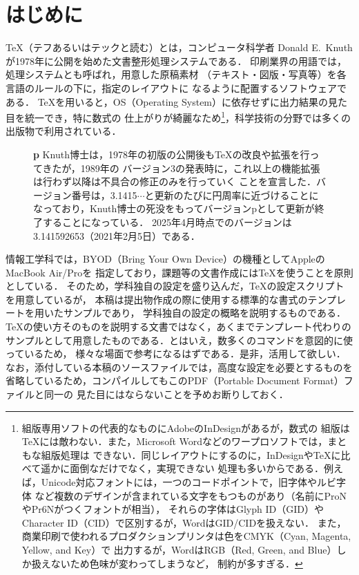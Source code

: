 \section{はじめに}

{\TeX}（テフあるいはテックと読む）とは，コンピュータ科学者
Donald E.\ Knuth \cite{Knuth}が1978年に公開を始めた文書整形処理システムである．
印刷業界の用語では，処理システムとも呼ばれ，用意した原稿素材
（テキスト・図版・写真等）を各言語のルール\cite{JIS}\cite{typst}の下に，指定のレイアウトに
なるように配置するソフトウェアである．
{\TeX}を用いると，OS（Operating System）に依存せずに出力結果の見た目を統一でき，特に数式の
仕上がりが綺麗なため\footnote{組版専用ソフトの代表的なものにAdobeのInDesignがあるが，数式の
組版は{\TeX}には敵わない．また，Microsoft Wordなどのワープロソフトでは，まともな組版処理は
できない．同じレイアウトにするのに，InDesignや{\TeX}に比べて遥かに面倒なだけでなく，実現できない
処理も多いからである．例えば，Unicode対応フォントには，一つのコードポイントで，旧字体やルビ字体
など複数のデザインが含まれている文字をもつものがあり（名前にProNやPr6Nがつくフォントが相当），
それらの字体はGlyph ID（GID）やCharacter ID（CID）で区別するが，WordはGID/CIDを扱えない．
また，商業印刷で使われるプロダクションプリンタは色をCMYK（Cyan, Magenta, Yellow, and Key）で
出力するが，WordはRGB（Red, Green, and Blue）しか扱えないため色味が変わってしまうなど，
制約が多すぎる．}，科学技術の分野では多くの出版物で利用されている．
\begin{figure}[b]
\begin{itembox}[l]{ \bfseries{\robotolgr p}}
\small\sffamily\mgfamily
Knuth博士は，1978年の初版の公開後も{\TeX}の改良や拡張を行ってきたが，1989年の
バージョン3の発表時に，これ以上の機能拡張は行わず以降は不具合の修正のみを行っていく
ことを宣言した．バージョン番号は，3.1415$\cdots$と更新のたびに円周率に近づけることに
なっており，Knuth博士の死没をもってバージョン{\robotolgr p}として更新が終了することになっている．
2025年4月時点でのバージョンは3.141592653（2021年2月5日）である．
\end{itembox}
\end{figure}

情報工学科では，BYOD（Bring Your Own Device）の機種としてAppleのMacBook Air/Proを
指定しており，課題等の文書作成には{\TeX}を使うことを原則としている．
そのため，学科独自の設定を盛り込んだ，{\TeX}の設定スクリプトを用意しているが，
本稿は提出物作成の際に使用する標準的な書式のテンプレートを用いたサンプルであり，
学科独自の設定の概略を説明するものである．
{\TeX}の使い方そのものを説明する文書ではなく，あくまでテンプレート代わりの
サンプルとして用意したものである．とはいえ，数多くのコマンドを意図的に使っているため，
様々な場面で参考になるはずである．是非，活用して欲しい．
なお，添付している本稿のソースファイルでは，高度な設定を必要とするものを
省略しているため，コンパイルしてもこのPDF（Portable Document Format）\cite{PDF}ファイルと同一の
見た目にはならないことを予めお断りしておく．

